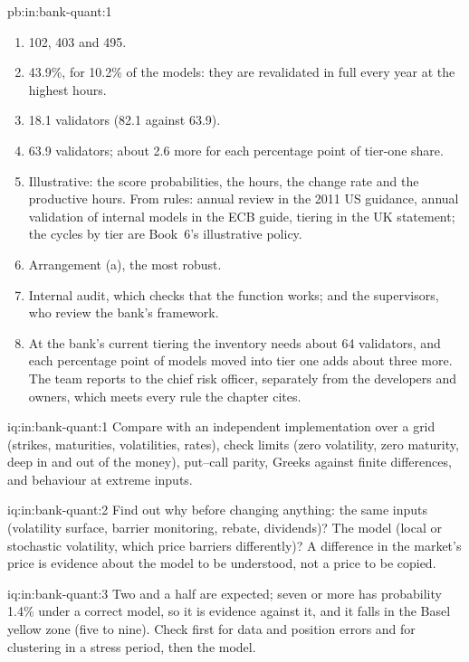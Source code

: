 \begin{solution}{pb:in:bank-quant:1}
\begin{enumerate}
(every two years), less tier three (every three years).
\item 102, 403 and 495.
\item 43.9\%, for 10.2\% of the models: they are revalidated in full every year at the highest hours.
\item 18.1 validators (82.1 against 63.9).
\item 63.9 validators; about 2.6 more for each percentage point of tier-one share.
\item Illustrative: the score probabilities, the hours, the change rate and the productive hours. From rules: annual
review in the 2011 US guidance, annual validation of internal models in the ECB guide, tiering in the UK statement; the
cycles by tier are Book~6's illustrative policy.
\item Arrangement (a), the most robust.
\item Internal audit, which checks that the function works; and the supervisors, who review the bank's framework.
\item At the bank's current tiering the inventory needs about 64 validators, and each percentage point of models moved
into tier one adds about three more. The team reports to the chief risk officer, separately from the developers and
owners, which meets every rule the chapter cites.
\end{enumerate}
\end{solution}

\begin{solution}{iq:in:bank-quant:1}
Compare with an independent implementation over a grid (strikes, maturities, volatilities, rates), check limits (zero
volatility, zero maturity, deep in and out of the money), put--call parity, Greeks against finite differences, and
behaviour at extreme inputs.
\end{solution}

\begin{solution}{iq:in:bank-quant:2}
Find out why before changing anything: the same inputs (volatility surface, barrier monitoring, rebate, dividends)? The
model (local or stochastic volatility, which price barriers differently)? A difference in the market's price is evidence
about the model to be understood, not a price to be copied.
\end{solution}

\begin{solution}{iq:in:bank-quant:3}
Two and a half are expected; seven or more has probability 1.4\% under a correct model, so it is evidence against it, and
it falls in the Basel yellow zone (five to nine). Check first for data and position errors and for clustering in a
stress period, then the model.
\end{solution}

